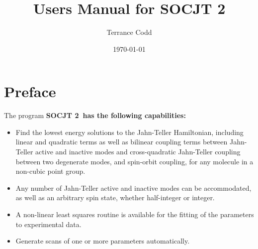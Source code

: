 \documentclass{article}
\newcommand{\socjttwo}{\bf{SOCJT 2}}
\newenvironment{bulletlist}{%
  \renewcommand{\labelitemi}{$\bullet $}%
     \begin{itemize}}{\end{itemize}}
\begin{document}
\author{Terrance Codd}
\title{Users Manual for \socjttwo}

\date{\today}

\maketitle

\tableofcontents
\newpage

\setcounter{section}{-1}
\section{Preface} \label{section:preface}

The program \socjttwo\ has the following
capabilities: 
\begin{bulletlist}
\item Find the lowest energy solutions to the Jahn-Teller Hamiltonian, including linear and quadratic terms as well as bilinear coupling terms between Jahn-Teller active and inactive modes and cross-quadratic Jahn-Teller coupling between two degenerate modes, and spin-orbit coupling, for any molecule in a non-cubic point group.
\item Any number of Jahn-Teller active and inactive modes can be accommodated, as well as an arbitrary spin state, whether half-integer or integer.
\item A non-linear least squares routine is available for the fitting of the parameters to experimental data.
\item Generate scans of one or more parameters automatically.
\end{bulletlist}
\end{document}

